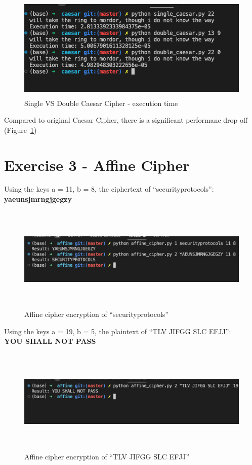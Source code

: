 \documentclass{article}
\begin{document}
\begin{figure}[htp]
    \centering
    \includegraphics[height=50mm, width=120mm]{single_double_caesar_time.png}
    \caption{Single VS Double Caesar Cipher - execution time}
    \label{fig:single_double_time}
\end{figure}

Compared to original Caesar Cipher, there is a significant performanc
drop off (Figure~\ref{fig:single_double_time})


\section*{Exercise 3 - Affine Cipher}
Using the keys a = 11, b = 8, the ciphertext of ``securityprotocols'':\\
\textbf{yaeunsjmrngjgegzy}

\begin{figure}[htp]
    \centering
    \includegraphics[width=120mm, height=50mm]{affine_encrypt.png}
    \caption{Affine cipher encryption of ``securityprotocols''}
    \label{fig:affine_encrypt}
\end{figure}

Using the keys a = 19, b = 5, the plaintext of ``TLV JIFGG SLC EFJJ'':\\
\textbf{YOU SHALL NOT PASS}

\begin{figure}[htp]
    \centering
    \includegraphics[width=120mm, height=50mm]{affine_decrypt.png}
    \caption{Affine cipher encryption of ``TLV JIFGG SLC EFJJ''}
    \label{fig:affine_decrypt}
\end{figure}
\end{document}
